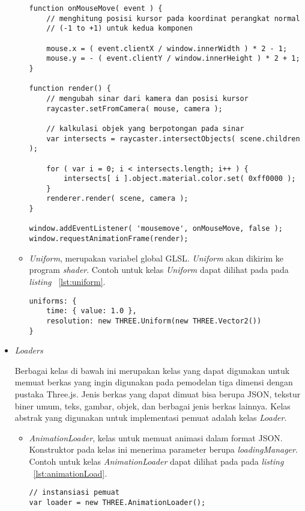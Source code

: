 \begin{itemize}
\begin{itemize}
\begin{lstlisting}[caption={Contoh penggunaan kelas {\it Raycaster}.}, label={lst:raycaster},captionpos=b]
function onMouseMove( event ) {
	// menghitung posisi kursor pada koordinat perangkat normal
	// (-1 to +1) untuk kedua komponen

	mouse.x = ( event.clientX / window.innerWidth ) * 2 - 1;
	mouse.y = - ( event.clientY / window.innerHeight ) * 2 + 1;
}

function render() {
	// mengubah sinar dari kamera dan posisi kursor
	raycaster.setFromCamera( mouse, camera );

	// kalkulasi objek yang berpotongan pada sinar
	var intersects = raycaster.intersectObjects( scene.children );

	for ( var i = 0; i < intersects.length; i++ ) {
		intersects[ i ].object.material.color.set( 0xff0000 );
	}
	renderer.render( scene, camera );
}

window.addEventListener( 'mousemove', onMouseMove, false );
window.requestAnimationFrame(render);
\end{lstlisting}
		\item{\it Uniform}, merupakan variabel global GLSL. {\it Uniform} akan dikirim ke program {\it shader}. Contoh untuk kelas {\it Uniform} dapat dilihat pada pada {\it listing} ~\ref{lst:uniform}.
	
\begin{lstlisting}[caption={Contoh penggunaan kelas {\it Uniform} yang diinisialisasi dengan nilai atau objek.}, label={lst:uniform},captionpos=b]
uniforms: {
	time: { value: 1.0 },
	resolution: new THREE.Uniform(new THREE.Vector2())
}
\end{lstlisting}
	\end{itemize}
	
	\item \textit{Loaders}
	
		Berbagai kelas di bawah ini merupakan kelas yang dapat digunakan untuk memuat berkas yang ingin digunakan pada pemodelan tiga dimensi dengan pustaka Three.js. Jenis berkas yang dapat dimuat bisa berupa JSON, tekstur biner umum, teks, gambar, objek, dan berbagai jenis berkas lainnya. Kelas abstrak yang digunakan untuk implementasi pemuat adalah kelas {\it Loader}.
	
	\begin{itemize}
		\item {\it AnimationLoader}, kelas untuk memuat animasi dalam format JSON. Konstruktor pada kelas ini menerima parameter berupa {\it loadingManager}. Contoh untuk kelas {\it AnimationLoader} dapat dilihat pada pada {\it listing} ~\ref{lst:animationLoad}.
\begin{lstlisting}[caption={Contoh penggunaan kelas {\it AnimationLoader}.}, label={lst:animationLoad},captionpos=b]
// instansiasi pemuat
var loader = new THREE.AnimationLoader();


\end{lstlisting}
\end{itemize}
\end{itemize}
